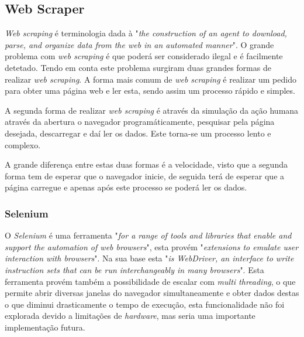 \subsection{Web Scraper}
\textit{Web scraping} é terminologia dada à "\emph{the construction of an agent to download, parse, and organize data from the web in an automated manner}"\citep{web_scraping}. O grande problema com \textit{web scraping} é que poderá ser considerado ilegal e é facilmente detetado. Tendo em conta este problema surgiram duas grandes formas de realizar \textit{web scraping}. A forma mais comum de \textit{web scraping} é realizar um pedido para obter uma página web e ler esta, sendo assim um processo rápido e simples.

A segunda forma de realizar \textit{web scraping} é através da simulação da ação humana através da abertura o navegador programáticamente, pesquisar pela página desejada, descarregar e daí ler os dados. Este torna-se um processo lento e complexo. 

A grande diferença entre estas duas formas é a velocidade, visto que a segunda forma tem de esperar que o navegador inicie, de seguida terá de esperar que a página carregue e apenas após este processo se poderá ler os dados.

\subsubsection{Selenium}

O \emph{Selenium} é uma ferramenta "\emph{for a range of tools and libraries that enable and support the automation of web browsers}", esta provém "\emph{extensions to emulate user interaction with browsers}". Na sua base esta "\emph{is WebDriver, an interface to write instruction sets that can be run interchangeably in many browsers}". Esta ferramenta provém também a possibilidade de escalar com \textit{multi threading}, o que permite abrir diversas janelas do navegador simultaneamente e obter dados destas o que diminui drasticamente o tempo de execução, esta funcionalidade não foi explorada devido a limitações de \textit{hardware}, mas seria uma importante implementação futura.